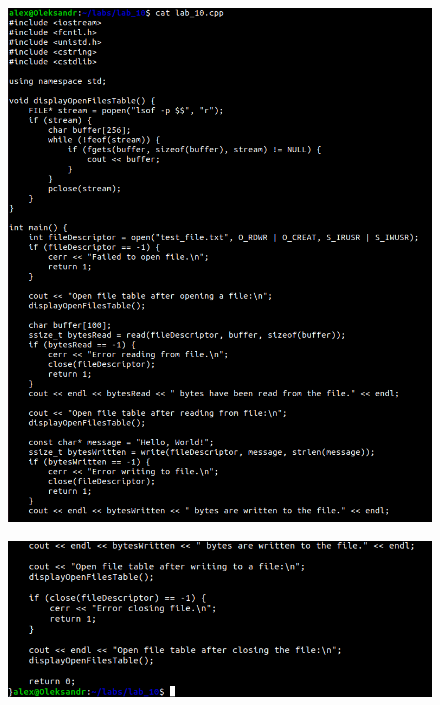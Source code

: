 \documentclass[a4paper,12pt]{article}
\begin{document}
\newpage
    \begin{figure}[h!]
        \begin{minipage}[h]{1\linewidth}
            \centering
            \includegraphics[width=0.8\linewidth]{Prt sc/Figure_1_1.png}  
        \end{minipage}
    \end{figure}
    \begin{figure}[h!]
        \begin{minipage}[h]{1\linewidth}
            \centering
            \includegraphics[width=0.8\linewidth]{Prt sc/Figure_1_2.png}  
        \end{minipage}
    \end{figure}
\end{document}
